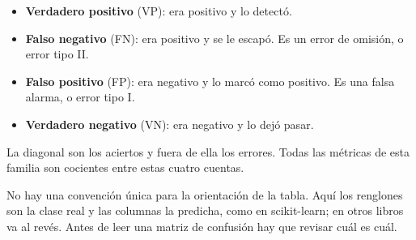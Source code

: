 \documentclass[11pt,letterpaper]{article}
\begin{document}
\begin{center}
\end{center}

\begin{itemize}[itemsep=0.3em]
    \item \textbf{Verdadero positivo} (VP): era positivo y lo detectó.
    \item \textbf{Falso negativo} (FN): era positivo y se le escapó.
          Es un error de omisión, o error tipo II.
    \item \textbf{Falso positivo} (FP): era negativo y lo marcó como
          positivo. Es una falsa alarma, o error tipo I.
    \item \textbf{Verdadero negativo} (VN): era negativo y lo dejó
          pasar.
\end{itemize}

La diagonal son los aciertos y fuera de ella los errores. Todas las
métricas de esta familia son cocientes entre estas cuatro cuentas.

\begin{ojo}
    No hay una convención única para la orientación de la tabla.
    Aquí los renglones son la clase real y las columnas la predicha,
    como en scikit-learn; en otros libros va al revés. Antes de leer
    una matriz de confusión hay que revisar cuál es cuál.
\end{ojo}
\end{document}
